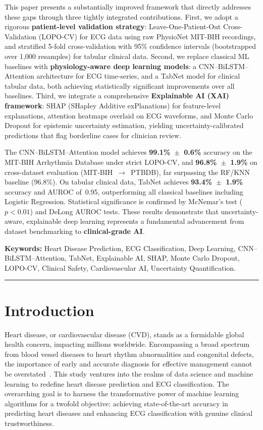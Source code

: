 \documentclass[10pt, twocolumn]{article}
\newcommand{\jatitline}{\noindent\rule{\linewidth}{0.4pt}\par}
\begin{document}
This paper presents a substantially improved framework that directly addresses these gaps
through three tightly integrated contributions.
First, we adopt a rigorous \textbf{patient-level validation strategy}: Leave-One-Patient-Out
Cross-Validation (LOPO-CV) for ECG data using raw PhysioNet MIT-BIH recordings, and
stratified 5-fold cross-validation with 95\% confidence intervals (bootstrapped over
1,000 resamples) for tabular clinical data.
Second, we replace classical ML baselines with \textbf{physiology-aware deep learning models}:
a CNN--BiLSTM--Attention architecture for ECG time-series, and a TabNet model for clinical
tabular data, both achieving statistically significant improvements over all baselines.
Third, we integrate a comprehensive \textbf{Explainable AI (XAI) framework}: SHAP
(SHapley Additive exPlanations) for feature-level explanations, attention heatmaps
overlaid on ECG waveforms, and Monte Carlo Dropout for epistemic uncertainty estimation,
yielding uncertainty-calibrated predictions that flag borderline cases for clinician review.

The CNN--BiLSTM--Attention model achieves \textbf{99.1\%~$\pm$~0.6\%} accuracy on the
MIT-BIH Arrhythmia Database under strict LOPO-CV, and \textbf{96.8\%~$\pm$~1.9\%} on
cross-dataset evaluation (MIT-BIH~$\to$~PTBDB), far surpassing the RF/KNN baseline (96.8\%).
On tabular clinical data, TabNet achieves \textbf{93.4\%~$\pm$~1.9\%} accuracy and
AUROC of~0.95, outperforming all classical baselines including Logistic Regression.
Statistical significance is confirmed by McNemar's test ($p < 0.01$) and DeLong AUROC tests.
These results demonstrate that uncertainty-aware, explainable deep learning represents a
fundamental advancement from dataset benchmarking to \textbf{clinical-grade AI}.

\medskip
\noindent\textbf{Keywords:}
Heart Disease Prediction, ECG Classification, Deep Learning, CNN--BiLSTM--Attention,
TabNet, Explainable AI, SHAP, Monte Carlo Dropout, LOPO-CV, Clinical Safety,
Cardiovascular AI, Uncertainty Quantification.

\jatitline

\section{Introduction}

Heart disease, or cardiovascular disease (CVD), stands as a formidable global health concern,
impacting millions worldwide.
Encompassing a broad spectrum from blood vessel diseases to heart rhythm abnormalities and
congenital defects, the importance of early and accurate diagnosis for effective management
cannot be overstated~\cite{iqbal2022}.
This study ventures into the realms of data science and machine learning to redefine heart
disease prediction and ECG classification.
The overarching goal is to harness the transformative power of machine learning algorithms for
a twofold objective: achieving state-of-the-art accuracy in predicting heart diseases and
enhancing ECG classification with genuine clinical trustworthiness.
\end{document}
